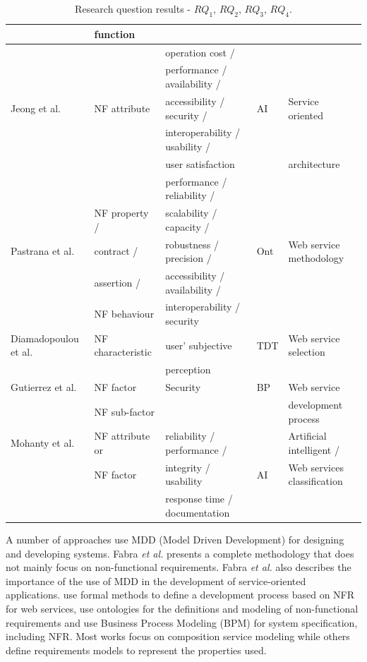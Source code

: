 \documentclass{sig-alternate}
\begin{document}
\begin{table}[ht!]
\begin{tabular}{l|l|l|l|l}
  &  function &    &  &
  \\
  \hline
   &  & operation cost /&  &  \\
  &  & performance / availability /  &  &  \\
  Jeong et al. \cite{JeongCL09} & NF attribute & accessibility / security /
  & AI  & Service oriented   \\ 
   &  &
  interoperability / usability / & & \\ &  & user satisfaction &  & architecture
  \\
  \hline
   &  & performance / reliability /  &  & \\
   & NF property / & scalability / capacity /&  & \\
  Pastrana et al. \cite{PastranaPK11} & contract  / & robustness /
  precision / & Ont & Web service methodology\\
  & assertion / & accessibility
  / availability / &  & \\ 
   & NF behaviour & interoperability / security  &  & \\    
  \hline
  Diamadopoulou et al. \cite{DiamadopoulouMPS08} & NF characteristic &
  user' subjective & TDT & Web service selection  \\ 
   &  & perception  & &  \\
  \hline
  Gutierrez et al. \cite{GutierrezRF10} & NF factor & Security  & BP &  Web
  service
  \\
   &  NF sub-factor&   &  &  development process
  \\  
  \hline
  Mohanty et al. \cite{MohantyRP10} & NF attribute or & reliability /
  performance / & & Artificial intelligent /\\ 
  & NF factor & integrity / usability  & AI  & Web services classification	 \\
  &  & response time / documentation &   &  \\
  
  \hline  
  \hline  
\end{tabular} 
\caption{Research question results - $RQ_1$, $RQ_2$, $RQ_3$, $RQ_4$.}
\label{tab:result02}
\end{table} 
 
A number of approaches use
\cite{DAmbrogio06,CholletL09,SchmelingCM11,BasinDL06,Fabra2011,OvaskaEHPA10} MDD
(Model Driven Development) for designing and developing systems. Fabra
\textit{et al.} \cite{Fabra2011} presents a complete methodology that does not
mainly focus on non-functional requirements. Fabra \textit{et al.} \cite{Fabra2011} also describes the importance of the use of MDD in the development of
service-oriented applications. \cite{ThissenW06,ZhangPSP05} use formal methods
to define a development process based on NFR for web services,
\cite{AgarwalLS09,PastranaPK11} use ontologies for the definitions and
modeling of non-functional requirements and \cite{XiaoCZBOLH08,GutierrezRF10} use Business Process Modeling (BPM) for
system specification, including NFR. Most works focus on composition
service modeling while others define requirements models to
represent the properties used.
\end{document}
